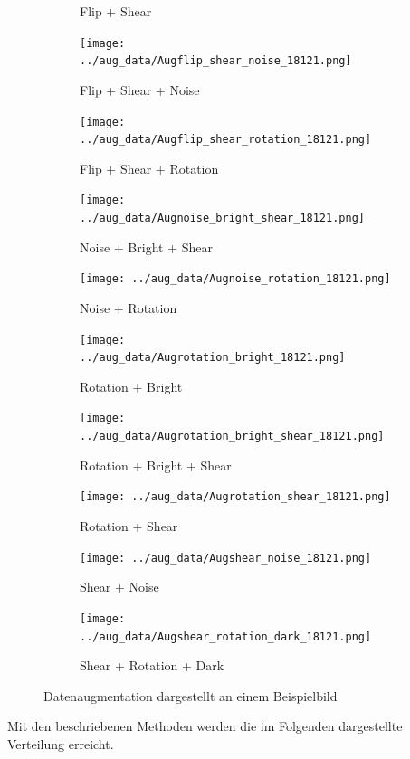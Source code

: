 \begin{figure}[H]
\begin{subfigure}[b]{0.2\textwidth}
		\caption{Flip + Shear}
	\end{subfigure} \hfill
	\begin{subfigure}[b]{0.2\textwidth}
		\texttt{[image: ../aug\_data/Augflip\_shear\_noise\_18121.png]}
		\caption{Flip + Shear + Noise}
	\end{subfigure} \hfill
	\begin{subfigure}[b]{0.2\textwidth}
		\texttt{[image: ../aug\_data/Augflip\_shear\_rotation\_18121.png]}
		\caption{Flip + Shear + Rotation}
	\end{subfigure} \hfill
	\begin{subfigure}[b]{0.2\textwidth}
		\texttt{[image: ../aug\_data/Augnoise\_bright\_shear\_18121.png]}
		\caption{Noise + Bright + Shear}
	\end{subfigure} \hfill
	\begin{subfigure}[b]{0.2\textwidth}
		\texttt{[image: ../aug\_data/Augnoise\_rotation\_18121.png]}
		\caption{Noise + Rotation}
	\end{subfigure} \hfill
	\begin{subfigure}[b]{0.2\textwidth}
		\texttt{[image: ../aug\_data/Augrotation\_bright\_18121.png]}
		\caption{Rotation + Bright}
	\end{subfigure} \hfill
	\begin{subfigure}[b]{0.2\textwidth}
		\texttt{[image: ../aug\_data/Augrotation\_bright\_shear\_18121.png]}
		\caption{Rotation + Bright + Shear}
	\end{subfigure} \hfill
	\begin{subfigure}[b]{0.2\textwidth}
		\texttt{[image: ../aug\_data/Augrotation\_shear\_18121.png]}
		\caption{Rotation + Shear}
	\end{subfigure} \hfill
	\begin{subfigure}[b]{0.2\textwidth}
		\texttt{[image: ../aug\_data/Augshear\_noise\_18121.png]}
		\caption{Shear + Noise}
	\end{subfigure} \hfill
	\begin{subfigure}[b]{0.2\textwidth}
		\texttt{[image: ../aug\_data/Augshear\_rotation\_dark\_18121.png]}
		\caption{Shear + Rotation + Dark}
	\end{subfigure} \hfill
	\caption{Datenaugmentation dargestellt an einem Beispielbild}
	\label{fig:augmentation}
\end{figure}

Mit den beschriebenen Methoden werden die im Folgenden dargestellte Verteilung erreicht.

